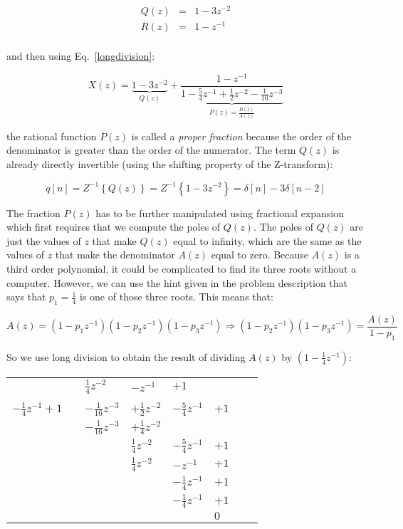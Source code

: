 \documentclass[a4paper,11pt,oneside]{article}
\begin{document}
\[
\begin{array}{lll}
Q(z)&=&1-3z^{-2}\\
R(z)&=&1-z^{-1}\\
\end{array}
\]

and then using Eq.~\ref{longdivision}:

\begin{equation}\label{eq2}
X(z)=\underbrace{1-3z^{-2}}_{Q(z)}+\underbrace{\frac{1-z^{-1}}{1-\frac{5}{4}z^{-1}+\frac{1}{2}z^{-2}-\frac{1}{16}z^{-3}}}_{P(z)=\frac{B(z)}{A(z)}}
\end{equation}

the rational function $P(z)$ is called a \emph{proper fraction} because the order of the denominator is greater than the order of the numerator. The term $Q(z)$ is already directly invertible (using the shifting property of the Z-transform):

\[
q[n]=Z^{-1}\left\{Q(z)\right\}=Z^{-1}\left\{1-3z^{-2}\right\}=\delta[n]-3\delta[n-2]
\]

The fraction $P(z)$ has to be further manipulated using fractional expansion which first requires that we compute the poles of $Q(z)$. The poles of $Q(z)$ are just the values of $z$ that make $Q(z)$ equal to infinity, which are the same as the values of $z$ that make the denominator $A(z)$ equal to zero. Because $A(z)$ is a third order polynomial, it could be complicated to find its three roots without a computer. However, we can use the hint given in the problem description that says that $p_1=\frac{1}{4}$ is one of those three roots. This means that:

\[
A(z)=(1-p_{1}z^{-1})(1-p_{2}z^{-1})(1-p_{3}z^{-1})\Rightarrow (1-p_{2}z^{-1})(1-p_{3}z^{-1})=\frac{A(z)}{1-p_1}
\]

So we use long division to obtain the result of dividing $A(z)$ by $(1-\frac{1}{4}z^{-1})$:

\begin{tabular}{r|cllllll}
&\qquad&$\frac{1}{4}z^{-2}$&$-z^{-1}$&$+1$&&&\\
\cline{2-8}
\\
$-\frac{1}{4}z^{-1}+1$&&$-\frac{1}{16}z^{-3}$&$+\frac{1}{2}z^{-2}$&$-\frac{5}{4}z^{-1}$&$+1$&&\\
&&$-\frac{1}{16}z^{-3}$&$+\frac{1}{4}z^{-2}$&&&&\\
\cline{3-8}
&&&$\frac{1}{4}z^{-2}$&$-\frac{5}{4}z^{-1}$&$+1$&&\\
&&&$\frac{1}{4}z^{-2}$&$-z^{-1}$&$+1$&&\\
\cline{4-8}
&&&&$-\frac{1}{4}z^{-1}$&$+1$&&\\
&&&&$-\frac{1}{4}z^{-1}$&$+1$&&\\
\cline{5-8}
&&&&&$0$&&\\
\end{tabular}
\end{document}
